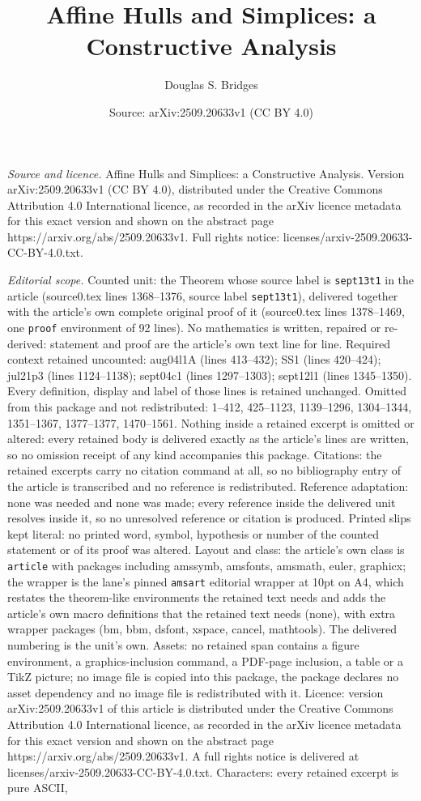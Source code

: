 \documentclass[10pt,a4paper]{amsart}
\title[Affine Hulls and Simplices: a Constructive Analysis]{Affine Hulls and Simplices: a Constructive Analysis}
\author{Douglas S. Bridges}
\date{Source: arXiv:2509.20633v1 (CC BY 4.0)}
\begin{document}
\maketitle

\noindent\emph{Source and licence.} Affine Hulls and Simplices: a Constructive Analysis. Version arXiv:2509.20633v1 (CC BY 4.0), distributed under the Creative Commons Attribution 4.0 International licence, as recorded in the arXiv licence metadata for this exact version and shown on the abstract page https://arxiv.org/abs/2509.20633v1. Full rights notice: licenses/arxiv-2509.20633-CC-BY-4.0.txt.\par\smallskip

\noindent\textit{Editorial scope.} Counted unit: the Theorem whose source label is \texttt{sept13t1} in the article (source0.tex lines 1368--1376, source label \texttt{sept13t1}), delivered together with the article's own complete original proof of it (source0.tex lines 1378--1469, one \texttt{proof} environment of 92 lines). No mathematics is written, repaired or re-derived: statement and proof are the article's own text line for line. Required context retained uncounted: aug04l1A (lines 413--432); SS1 (lines 420--424); jul21p3 (lines 1124--1138); sept04c1 (lines 1297--1303); sept12l1 (lines 1345--1350). Every definition, display and label of those lines is retained unchanged. Omitted from this package and not redistributed: 1--412, 425--1123, 1139--1296, 1304--1344, 1351--1367, 1377--1377, 1470--1561. Nothing inside a retained excerpt is omitted or altered: every retained body is delivered exactly as the article's lines are written, so no omission receipt of any kind accompanies this package. Citations: the retained excerpts carry no citation command at all, so no bibliography entry of the article is transcribed and no reference is redistributed. Reference adaptation: none was needed and none was made; every reference inside the delivered unit resolves inside it, so no unresolved reference or citation is produced. Printed slips kept literal: no printed word, symbol, hypothesis or number of the counted statement or of its proof was altered. Layout and class: the article's own class is \texttt{article} with packages including amssymb, amsfonts, amsmath, euler, graphicx; the wrapper is the lane's pinned \texttt{amsart} editorial wrapper at 10pt on A4, which restates the theorem-like environments the retained text needs and adds the article's own macro definitions that the retained text needs (none), with extra wrapper packages (bm, bbm, dsfont, xspace, cancel, mathtools). The delivered numbering is the unit's own. Assets: no retained span contains a figure environment, a graphics-inclusion command, a PDF-page inclusion, a table or a TikZ picture; no image file is copied into this package, the package declares no asset dependency and no image file is redistributed with it. Licence: version arXiv:2509.20633v1 of this article is distributed under the Creative Commons Attribution 4.0 International licence, as recorded in the arXiv licence metadata for this exact version and shown on the abstract page https://arxiv.org/abs/2509.20633v1. A full rights notice is delivered at licenses/arxiv-2509.20633-CC-BY-4.0.txt. Characters: every retained excerpt is pure ASCII, 
\end{document}
